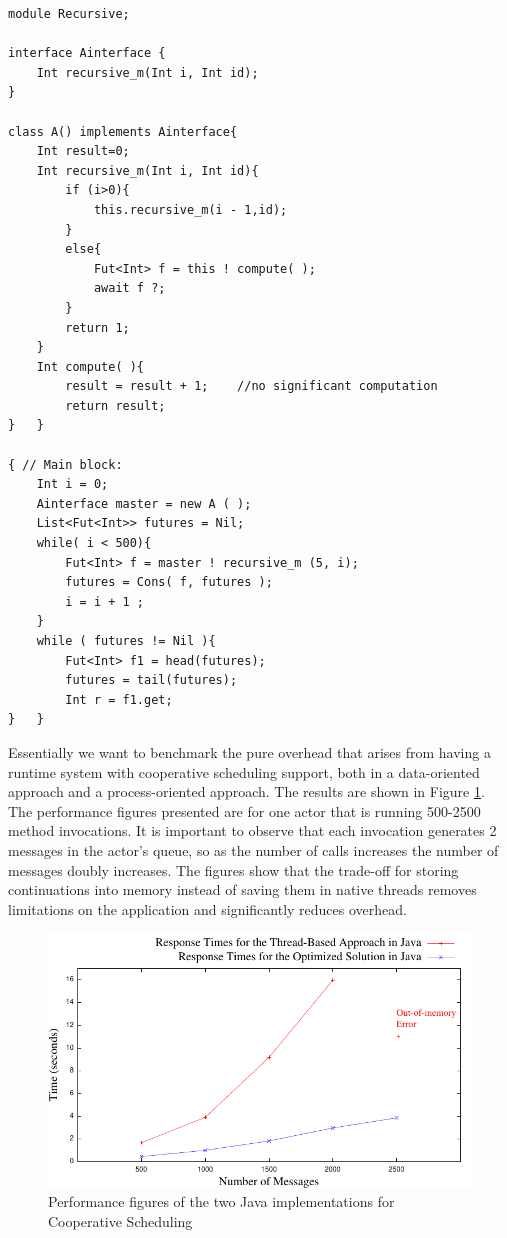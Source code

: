 \begin{lstlisting}[caption= Benchmark Example, label=absex]
module Recursive;

interface Ainterface {
	Int recursive_m(Int i, Int id);
}

class A() implements Ainterface{
	Int result=0;
	Int recursive_m(Int i, Int id){
		if (i>0){
			this.recursive_m(i - 1,id);	
		}
		else{
			Fut<Int> f = this ! compute( );
			await f ?;
		}
		return 1;
	}
	Int compute( ){
		result = result + 1;	//no significant computation
		return result;
}	}

{ // Main block:
	Int i = 0;	
	Ainterface master = new A ( );
	List<Fut<Int>> futures = Nil;	
	while( i < 500){		
		Fut<Int> f = master ! recursive_m (5, i);
		futures = Cons( f, futures );
		i = i + 1 ;
	}
	while ( futures != Nil ){
		Fut<Int> f1 = head(futures);
		futures = tail(futures);
		Int r = f1.get;
}	}
\end{lstlisting}
 \par Essentially we want to benchmark the pure overhead that arises from having a runtime system with cooperative scheduling support, both in a data-oriented approach and a process-oriented approach. The results are shown in Figure \ref{jj}. The performance figures presented are for one actor that is running 500-2500 method invocations. It is important to observe that each invocation generates 2 messages in the actor's queue, so as the number of calls increases the number of messages doubly increases. The figures show that the trade-off for storing continuations into memory instead of saving them in native threads removes limitations on the application and significantly reduces overhead.
\begin{figure}
	\centering
	\includegraphics[scale=.9]{jaj8.pdf}
	\caption{Performance figures of the two Java implementations for Cooperative Scheduling}
	\label{jj}
\end{figure}


